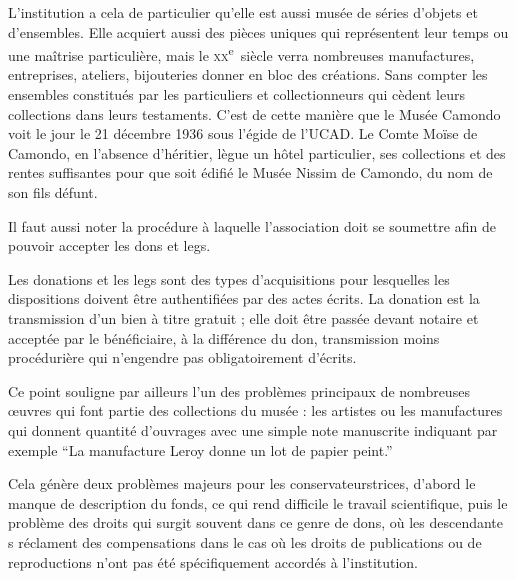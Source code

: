 L'institution a cela de particulier qu'elle est aussi musée de séries d'objets et d'ensembles. Elle acquiert aussi des pièces uniques qui représentent leur temps ou une maîtrise particulière, mais le \textsc{xx}\textsuperscript{e}~siècle verra nombreuses manufactures, entreprises, ateliers, bijouteries donner en bloc des créations. Sans compter les ensembles constitués par les particuliers et collectionneurs qui cèdent leurs collections dans leurs testaments. C'est de cette manière que le Musée Camondo voit le jour le 21 décembre 1936 sous l'égide de l'UCAD. Le Comte Moïse de Camondo, en l'absence d'héritier, lègue un hôtel particulier, ses collections et des rentes suffisantes pour que soit édifié le Musée Nissim de Camondo, du nom de son fils défunt. 

Il faut aussi noter la procédure à laquelle l'association doit se soumettre afin de pouvoir accepter les dons et legs.

\vspace{1em}

\noindent
\hspace*{1cm}
\begin{minipage}{\dimexpr\linewidth-2cm}
\fontsize{10}{12}\selectfont
Les donations et les legs sont des types d’acquisitions pour lesquelles les dispositions doivent être authentifiées par des actes écrits. La donation est la transmission d’un bien à titre gratuit ; elle doit être passée devant notaire et acceptée par le bénéficiaire, à la différence du don, transmission moins procédurière qui n’engendre pas obligatoirement d’écrits. \footnotemark{}                                                     
\end{minipage}

\vspace{1em}


 Ce point souligne par ailleurs l'un des problèmes principaux de nombreuses œuvres qui font partie des collections du musée : les artistes ou les manufactures qui donnent quantité d'ouvrages avec une simple note manuscrite indiquant par exemple \enquote{La manufacture Leroy donne un lot de papier peint.} 

Cela génère deux problèmes majeurs pour les conservateurs\wokisme trices, d'abord le manque de description du fonds, ce qui rend difficile le travail scientifique, puis le problème des droits qui surgit souvent dans ce genre de dons, où les descendant\wokisme e \wokisme s réclament des compensations dans le cas où les droits de publications ou de reproductions n'ont pas été spécifiquement accordés à l'institution. 
\vspace{1em}

